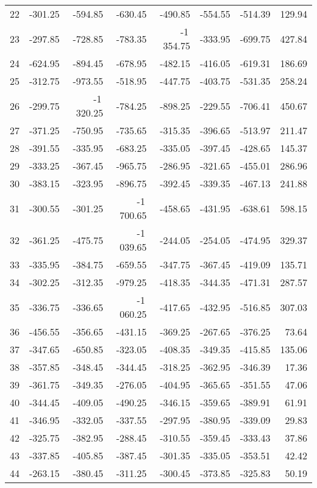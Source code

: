 \begin{longtable}{rrrrrrrr}
22 & -301.25 & -594.85 & -630.45 & -490.85 & -554.55 & -514.39 & 129.94  \\
23 & -297.85 & -728.85 & -783.35 & -1\,354.75 & -333.95 & -699.75 & 427.84  \\
24 & -624.95 & -894.45 & -678.95 & -482.15 & -416.05 & -619.31 & 186.69  \\
25 & -312.75 & -973.55 & -518.95 & -447.75 & -403.75 & -531.35 & 258.24  \\
26 & -299.75 & -1\,320.25 & -784.25 & -898.25 & -229.55 & -706.41 & 450.67  \\
27 & -371.25 & -750.95 & -735.65 & -315.35 & -396.65 & -513.97 & 211.47  \\
28 & -391.55 & -335.95 & -683.25 & -335.05 & -397.45 & -428.65 & 145.37  \\
29 & -333.25 & -367.45 & -965.75 & -286.95 & -321.65 & -455.01 & 286.96  \\
30 & -383.15 & -323.95 & -896.75 & -392.45 & -339.35 & -467.13 & 241.88  \\
31 & -300.55 & -301.25 & -1\,700.65 & -458.65 & -431.95 & -638.61 & 598.15  \\
32 & -361.25 & -475.75 & -1\,039.65 & -244.05 & -254.05 & -474.95 & 329.37  \\
33 & -335.95 & -384.75 & -659.55 & -347.75 & -367.45 & -419.09 & 135.71  \\
34 & -302.25 & -312.35 & -979.25 & -418.35 & -344.35 & -471.31 & 287.57  \\
35 & -336.75 & -336.65 & -1\,060.25 & -417.65 & -432.95 & -516.85 & 307.03  \\
36 & -456.55 & -356.65 & -431.15 & -369.25 & -267.65 & -376.25 & 73.64  \\
37 & -347.65 & -650.85 & -323.05 & -408.35 & -349.35 & -415.85 & 135.06  \\
38 & -357.85 & -348.45 & -344.45 & -318.25 & -362.95 & -346.39 & 17.36  \\
39 & -361.75 & -349.35 & -276.05 & -404.95 & -365.65 & -351.55 & 47.06  \\
40 & -344.45 & -409.05 & -490.25 & -346.15 & -359.65 & -389.91 & 61.91  \\
41 & -346.95 & -332.05 & -337.55 & -297.95 & -380.95 & -339.09 & 29.83  \\
42 & -325.75 & -382.95 & -288.45 & -310.55 & -359.45 & -333.43 & 37.86  \\
43 & -337.85 & -405.85 & -387.45 & -301.35 & -335.05 & -353.51 & 42.42  \\
44 & -263.15 & -380.45 & -311.25 & -300.45 & -373.85 & -325.83 & 50.19  \\

\end{longtable}
